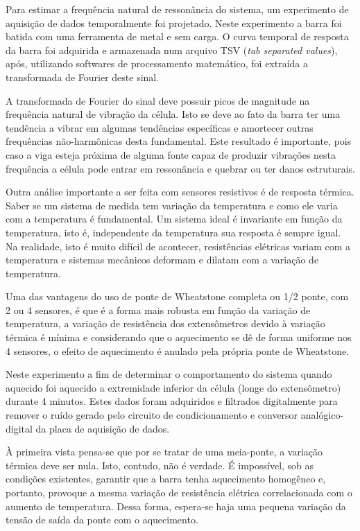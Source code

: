 \documentclass[a4paper]{instrumentacao}
\begin{document}

Para estimar a frequência natural de ressonância do sistema, um experimento de aquisição de dados temporalmente foi projetado. Neste experimento a barra foi batida com uma ferramenta de metal e sem carga. O curva temporal de resposta da barra foi adquirida e armazenada num arquivo TSV (\textit{tab separated values}), após, utilizando softwares de processamento matemático, foi extraída a transformada de Fourier deste sinal.

A transformada de Fourier do sinal deve possuir picos de magnitude na frequência natural de vibração da célula. Isto se deve ao fato da barra ter uma tendência a vibrar em algumas tendências específicas e amortecer outras frequências não-harmônicas desta fundamental. Este resultado é importante, pois caso a viga esteja próxima de alguma fonte capaz de produzir vibrações nesta frequência a célula pode entrar em ressonância e quebrar ou ter danos estruturais.

Outra análise importante a ser feita com sensores resistivos é de resposta térmica. Saber se um sistema de medida tem variação da temperatura e como ele varia com a temperatura é fundamental. Um sistema ideal é invariante em função da temperatura, isto é, independente da temperatura sua resposta é sempre igual. Na realidade, isto é muito difícil de acontecer, resistências elétricas variam com a temperatura e sistemas mecânicos deformam e dilatam com a variação de temperatura.

Uma das vantagens do uso de ponte de Wheatstone completa ou 1/2 ponte, com 2 ou 4 sensores, é que é a forma mais robusta em função da variação de temperatura, a variação de resistência dos extensômetros devido à variação térmica é mínima e considerando que o aquecimento se dê de forma uniforme nos 4 sensores, o efeito de aquecimento é anulado pela própria ponte de Wheatstone.

Neste experimento a fim de determinar o comportamento do sistema quando aquecido foi aquecido a extremidade inferior da célula (longe do extensômetro) durante 4 minutos. Estes dados foram adquiridos e filtrados digitalmente para remover o ruído gerado pelo circuito de condicionamento e conversor analógico-digital da placa de aquisição de dados.

À primeira vista pensa-se que por se tratar de uma meia-ponte, a variação térmica deve ser nula. Isto, contudo, não é verdade. É impossível, sob as condições existentes, garantir que a barra tenha aquecimento homogêneo e, portanto, provoque a mesma variação de resistência elétrica correlacionada com o aumento de temperatura. Dessa forma, espera-se haja uma pequena variação da tensão de saída da ponte com o aquecimento.
\end{document}
